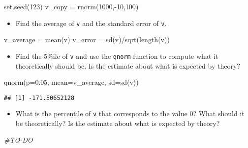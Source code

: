 \documentclass[
]{article}
\newenvironment{Shaded}{\begin{snugshade}}{\end{snugshade}}
\newcommand{\AttributeTok}[1]{\textcolor[rgb]{0.77,0.63,0.00}{#1}}
\newcommand{\CommentTok}[1]{\textcolor[rgb]{0.56,0.35,0.01}{\textit{#1}}}
\newcommand{\DecValTok}[1]{\textcolor[rgb]{0.00,0.00,0.81}{#1}}
\newcommand{\FloatTok}[1]{\textcolor[rgb]{0.00,0.00,0.81}{#1}}
\newcommand{\FunctionTok}[1]{\textcolor[rgb]{0.00,0.00,0.00}{#1}}
\newcommand{\NormalTok}[1]{#1}
\newcommand{\OtherTok}[1]{\textcolor[rgb]{0.56,0.35,0.01}{#1}}
\newcommand{\SpecialCharTok}[1]{\textcolor[rgb]{0.00,0.00,0.00}{#1}}
\providecommand{\tightlist}{%
  \setlength{\itemsep}{0pt}\setlength{\parskip}{0pt}}
\begin{document}
\begin{Shaded}
\begin{Highlighting}[]
\FunctionTok{set.seed}\NormalTok{(}\DecValTok{123}\NormalTok{)}
\NormalTok{v\_copy }\OtherTok{=} \FunctionTok{rnorm}\NormalTok{(}\DecValTok{1000}\NormalTok{,}\SpecialCharTok{{-}}\DecValTok{10}\NormalTok{,}\DecValTok{100}\NormalTok{)}
\end{Highlighting}
\end{Shaded}

\begin{itemize}
\tightlist
\item
  Find the average of \texttt{v} and the standard error of \texttt{v}.
\end{itemize}

\begin{Shaded}
\begin{Highlighting}[]
\NormalTok{v\_average }\OtherTok{=} \FunctionTok{mean}\NormalTok{(v)}
\NormalTok{v\_error }\OtherTok{=} \FunctionTok{sd}\NormalTok{(v)}\SpecialCharTok{/}\FunctionTok{sqrt}\NormalTok{(}\FunctionTok{length}\NormalTok{(v))}
\end{Highlighting}
\end{Shaded}

\begin{itemize}
\tightlist
\item
  Find the 5\%ile of \texttt{v} and use the \texttt{qnorm} function to
  compute what it theoretically should be. Is the estimate about what is
  expected by theory?
\end{itemize}

\begin{Shaded}
\begin{Highlighting}[]
\FunctionTok{qnorm}\NormalTok{(}\AttributeTok{p=}\FloatTok{0.05}\NormalTok{, }\AttributeTok{mean=}\NormalTok{v\_average, }\AttributeTok{sd=}\FunctionTok{sd}\NormalTok{(v))}
\end{Highlighting}
\end{Shaded}

\begin{verbatim}
## [1] -171.50652128
\end{verbatim}

\begin{itemize}
\tightlist
\item
  What is the percentile of \texttt{v} that corresponds to the value 0?
  What should it be theoretically? Is the estimate about what is
  expected by theory?
\end{itemize}

\begin{Shaded}
\begin{Highlighting}[]
\CommentTok{\#TO{-}DO}
\end{Highlighting}
\end{Shaded}
\end{document}
